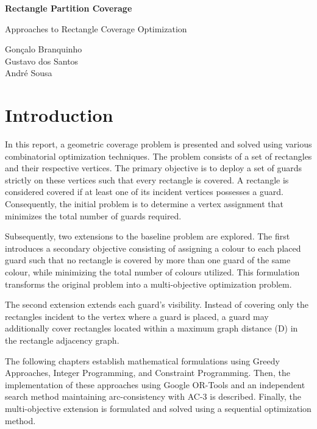 \documentclass{report}
\begin{document}
\vspace*{2cm}

{\noindent\Huge\textbf{Rectangle Partition Coverage}}


\begin{center}

\vspace{0.5cm}

{\Large Approaches to Rectangle Coverage Optimization}

\vspace{12cm}

{\large Gonçalo Branquinho \\ Gustavo dos Santos \\ André Sousa}
\end{center}

\vspace{1cm}





\chapter{Introduction}

In this report, a geometric coverage problem is presented and solved using various combinatorial optimization techniques. The problem consists of a set of rectangles and their respective vertices. The primary objective is to deploy a set of guards strictly on these vertices such that every rectangle is covered. A rectangle is considered covered if at least one of its incident vertices possesses a guard. Consequently, the initial problem is to determine a vertex assignment that minimizes the total number of guards required.

Subsequently, two extensions to the baseline problem are explored. The first introduces a secondary objective consisting of assigning a colour to each placed guard such that no rectangle is covered by more than one guard of the same colour, while minimizing the total number of colours utilized. This formulation transforms the original problem into a multi-objective optimization problem.

The second extension extends each guard's visibility. Instead of covering only the rectangles incident to the vertex where a guard is placed, a guard may additionally cover rectangles located within a maximum graph distance (D) in the rectangle adjacency graph.

The following chapters establish mathematical formulations using Greedy Approaches, Integer Programming, and Constraint Programming. Then, the implementation of these approaches using Google OR-Tools and an independent search method maintaining arc-consistency with AC-3 is described. Finally, the multi-objective extension is formulated and solved using a sequential optimization method. 
\end{document}
